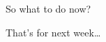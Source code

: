 \documentclass{hertieteaching}
\begin{document}
\begin{frame}{So what to do now?}

That's for next week\ldots


\end{frame}
%
%
%
%
%
%
%
%
%
%
%
%
%
%
%
%
%
%
%
%
%
%
\end{document}
